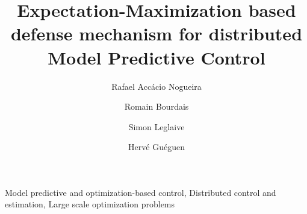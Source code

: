 \documentclass{ifacconf}  %
\begin{document}
\begin{frontmatter}
\title{\LARGE \bf
  Expectation-Maximization based defense mechanism for distributed Model Predictive Control
}

\author[First]{Rafael Accácio Nogueira}
\author[First]{Romain Bourdais}
\author[First]{Simon Leglaive}
\author[First]{Hervé Guéguen}
\address[First]{IETR-CentraleSupélec, 35510 Cesson-Sévigné, Ille-et-Vilaine, France\\
{\tt\small \{rafael-accacio.nogueira, romain.bourdais, simon.leglaive, herve.gueguen\}
@centralesupelec.fr}}




\begin{abstract}%
\end{abstract}

\begin{keyword}
  Model predictive and optimization-based control,
  Distributed control and estimation,
Large scale optimization problems
\end{keyword}

\end{frontmatter}
\end{document}
